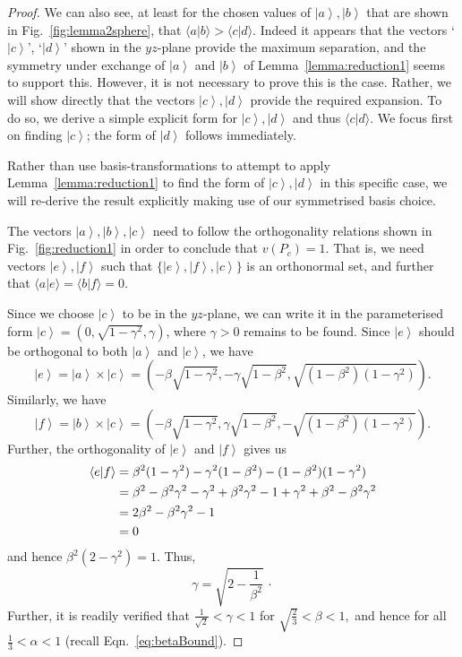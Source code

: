 \documentclass[%
 superscriptaddress,
 preprint,
 showpacs,
 showkeys,
 nofootinbib,
  amsmath,amssymb,
  aps,
  longbibliography,
  floatfix,
 ]{revtex4-1}
\theoremstyle{definition}
\newcommand{\ket}[1]{\left| #1 \right>}
\newcommand{\iprod}[2]{\langle #1 | #2 \rangle}
\begin{document}
\begin{proof}
	We can also see, at least for the chosen values of $\ket{a},\ket{b}$ that are shown in Fig.~\ref{fig:lemma2sphere}, that $\iprod{a}{b}>\iprod{c}{d}$.
	Indeed it appears that the vectors `$\ket{c}$', `$\ket{d}$' shown in the $yz$-plane provide the maximum separation, and the symmetry under exchange of $\ket{a}$ and $\ket{b}$ of Lemma~\ref{lemma:reduction1}  seems to support this.
	However, it is not necessary to prove this is the case.
	Rather, we will show directly that the vectors $\ket{c},\ket{d}$ provide the required expansion.
	To do so, we derive a simple explicit form for $\ket{c},\ket{d}$ and thus $\iprod{c}{d}$.
	We focus first on finding $\ket{c}$; the form of $\ket{d}$ follows immediately.
	
	Rather than use basis-transformations to attempt to apply Lemma~\ref{lemma:reduction1} to find the form of $\ket{c},\ket{d}$ in this specific case, we will re-derive the result explicitly making use of our symmetrised basis choice.
	
	The vectors $\ket{a},\ket{b},\ket{c}$ need to follow the orthogonality relations shown in Fig.~\ref{fig:reduction1} in order to conclude that $v(P_{c})=1$.
	 That is, we need vectors $\ket{e},\ket{f}$ such that $\{\ket{e},\ket{f},\ket{c}\}$ is an orthonormal set, and further that $\iprod{a}{e}=\iprod{b}{f}=0$.
	
	Since we choose $\ket{c}$ to be in the $yz$-plane, we can write it in the parameterised form
	$\ket{c}=\left(0,\sqrt{1-\gamma^2},\gamma\right)$, where $\gamma >0$ remains to be found.
	Since $\ket{e}$ should be orthogonal to both $\ket{a}$ and $\ket{c}$, we have  $$\ket{e}=\ket{a}\times\ket{c}=\left(-\beta\sqrt{1-\gamma^2},-\gamma\sqrt{1-\beta^2},\sqrt{(1-\beta^2)(1-\gamma^2)}\right).$$
	Similarly, we have $$\ket{f}=\ket{b}\times\ket{c}=\left(-\beta\sqrt{1-\gamma^2},\gamma\sqrt{1-\beta^2},-\sqrt{(1-\beta^2)(1-\gamma^2)}\right).$$
	Further, the orthogonality of $\ket{e}$ and $\ket{f}$ gives us
	\begin{align*}
		 \iprod{e}{f}&=\beta^2(1-\gamma^2)-\gamma^2(1-\beta^2)-(1-\beta^2)(1-\gamma^2)\\
		 &=\beta^2 - \beta^2\gamma^2 - \gamma^2 + \beta^2\gamma^2 - 1 + \gamma^2 + \beta^2 - \beta^2\gamma^2\notag\\
		 &=2\beta^2-\beta^2\gamma^2-1\notag\\
		 &=0\notag
	\end{align*}
	and hence
	$\beta^2(2-\gamma^2)=1.$
	Thus,
	\begin{equation}\label{eqn:gamma}
		\gamma=\sqrt{2-\frac{1}{\beta^2}}\,\cdot
	\end{equation}
	Further, it is readily verified that $\frac{1}{\sqrt{2}}<\gamma<1$ for $\sqrt{\frac{2}{3}}<\beta<1,$ and hence for all $\frac{1}{3}<\alpha<1$ (recall Eqn.~\ref{eq:betaBound}).
	

\end{proof}
\end{document}

